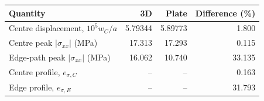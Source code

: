 \begin{tabularx}{\linewidth}{Xrrr}
\toprule
Quantity & 3D & Plate & Difference (\%) \\
\midrule
Centre displacement, $10^5w_C/a$ & 5.79344 & 5.89773 & 1.800 \\
Centre peak $|\sigma_{xx}|$ (MPa) & 17.313 & 17.293 & 0.115 \\
Edge-path peak $|\sigma_{xx}|$ (MPa) & 16.062 & 10.740 & 33.135 \\
Centre profile, $e_{\sigma,C}$ & -- & -- & 0.163 \\
Edge profile, $e_{\sigma,E}$ & -- & -- & 31.793 \\
\bottomrule
\end{tabularx}
